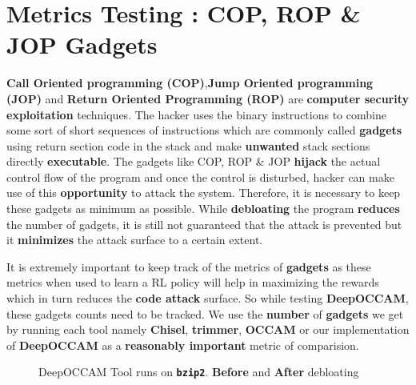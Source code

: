 \documentclass{article} %
\begin{document}
\section*{\color{darkmidnightblue} Metrics Testing : COP, ROP \& JOP Gadgets} 
\textbf{Call Oriented programming (COP)},\textbf{Jump Oriented programming (JOP)} and \textbf{Return Oriented Programming (ROP)} are \textbf{computer security exploitation} techniques. The hacker uses the binary instructions to combine some sort of short sequences of instructions which are commonly called \textbf{gadgets} using return section code in the stack and make \textbf{unwanted} stack sections directly \textbf{executable}. The gadgets like COP, ROP \& JOP \textbf{hijack} the actual control flow of the program and once the control is disturbed, hacker can make use of this \textbf{opportunity} to attack the system. Therefore, it is necessary to keep these gadgets as minimum as possible. While \textbf{debloating} the program \textbf{reduces} the number of gadgets, it is still not guaranteed that the attack is prevented but it \textbf{minimizes} the attack surface to a certain extent.

It is extremely important to keep track of the metrics of \textbf{gadgets} as these metrics when used to learn a RL policy will help in maximizing the rewards which in turn reduces the \textbf{code attack} surface. So while testing \textbf{DeepOCCAM}, these gadgets counts need to be tracked. We use the \textbf{number} of \textbf{gadgets} we get by running each tool namely \textbf{Chisel}, \textbf{trimmer}, \textbf{OCCAM} or our implementation of \textbf{DeepOCCAM} as a \textbf{\color{ao(english)} reasonably important} metric of comparision. 

\begin{figure}%
	\centering
	\qquad
	\caption{DeepOCCAM Tool runs on \textbf{\texttt{bzip2}}. \textbf{\color{red} Before} and \textbf{\color{ao(english)} After} debloating}%
	\label{fig:example}%
\end{figure}
\end{document}
